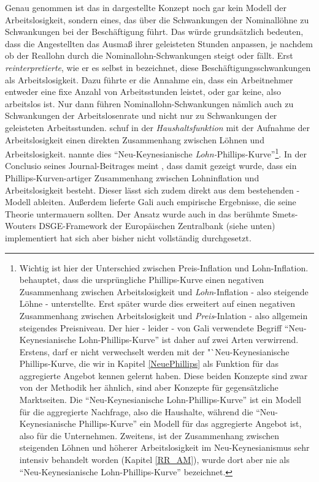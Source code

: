 Genau genommen ist das in \textcite{Erceg2000} dargestellte Konzept noch gar kein Modell der Arbeitslosigkeit, sondern eines, das über die Schwankungen der Nominallöhne zu Schwankungen bei der Beschäftigung führt. Das würde grundsätzlich bedeuten, dass die Angestellten das Ausmaß ihrer geleisteten Stunden anpassen, je nachdem ob der Reallohn durch die Nominallohn-Schwankungen steigt oder fällt. Erst \textcite{Gali2011a} \textit{reinterpretierte}, wie er es selbst in \textcite[S. 200]{Gali2015} bezeichnet, diese Beschäftigungsschwankungen als Arbeitslosigkeit. Dazu führte er die Annahme ein, dass ein Arbeitnehmer entweder eine fixe Anzahl von Arbeitsstunden leistet, oder gar keine, also arbeitslos ist. Nur dann führen Nominallohn-Schwankungen nämlich auch zu Schwankungen der Arbeitslosenrate und nicht nur zu Schwankungen der geleisteten Arbeitsstunden. \textcite{Gali2011a, Gali2011b} schuf in der \textit{Haushaltsfunktion} mit der Aufnahme der Arbeitslosigkeit einen direkten Zusammenhang zwischen Löhnen und Arbeitslosigkeit. \textcite[S. 441]{Gali2011a} nannte dies "`Neu-Keynesianische \textit{Lohn-}Phillips-Kurve"'\footnote{Wichtig ist hier der Unterschied zwischen Preis-Inflation und Lohn-Inflation. \textcite[S. 444]{Gali2011a} behauptet, dass die ursprüngliche Phillips-Kurve einen negativen Zusammenhang zwischen Arbeitslosigkeit und \textit{Lohn}-Inflation - also steigende Löhne - unterstellte. Erst später wurde dies erweitert auf einen negativen Zusammenhang zwischen Arbeitslosigkeit und \textit{Preis}-Inlation - also allgemein steigendes Preisniveau. Der hier - leider - von Gali verwendete Begriff "`Neu-Keynesianische Lohn-Phillips-Kurve"' ist daher auf zwei Arten verwirrend. Erstens, darf er nicht verwechselt werden mit der "`Neu-Keynesianische Phillips-Kurve, die wir in Kapitel \ref{NeuePhillips} als Funktion für das aggregierte Angebot kennen gelernt haben. Diese beiden Konzepte sind zwar von der Methodik her ähnlich, sind aber Konzepte für gegensätzliche  Marktseiten. Die "`Neu-Keynesianische Lohn-Phillips-Kurve"' ist ein Modell für die aggregierte Nachfrage, also die Haushalte, während die "`Neu-Keynesianische Phillips-Kurve"' ein Modell für das aggregierte Angebot ist, also für die Unternehmen. Zweitens, ist der Zusammenhang zwischen steigenden Löhnen und höherer Arbeitslosigkeit im Neu-Keynesianismus sehr intensiv behandelt worden (Kapitel \ref{RR_AM}), wurde dort aber nie als "`Neu-Keynesianische Lohn-Phillips-Kurve"' bezeichnet.}. In der Conclusio seines Journal-Beitrages meint \textcite{Gali2011a}, dass damit gezeigt wurde, dass ein Phillips-Kurven-artiger Zusammenhang zwischen Lohninflation und Arbeitslosigkeit besteht. Dieser lässt sich zudem direkt aus dem bestehenden \textcite{Erceg2000}-Modell ableiten. Außerdem lieferte Gali auch empirische Ergebnisse, die seine Theorie untermauern sollten. Der Ansatz wurde auch in das berühmte Smets-Wouters DSGE-Framework der Europäischen Zentralbank (siehe unten) implementiert \parencite{GaliSmetsWouters2012} hat sich aber bisher nicht vollständig durchgesetzt. 

